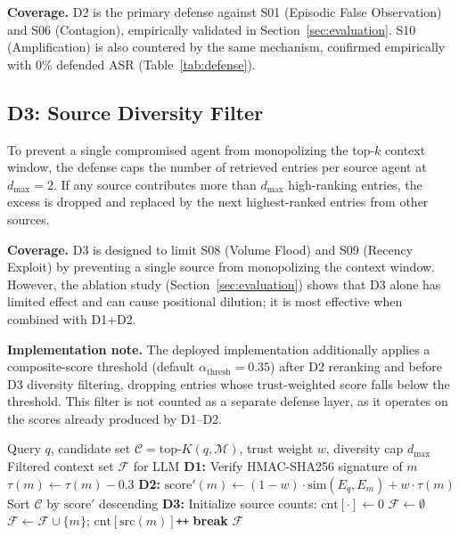 \documentclass[conference]{IEEEtran}
\begin{document}
\textbf{Coverage.} D2 is the primary defense against S01 (Episodic False Observation) and S06 (Contagion), empirically validated in Section~\ref{sec:evaluation}. S10 (Amplification) is also countered by the same mechanism, confirmed empirically with 0\% defended ASR (Table~\ref{tab:defense}).

\subsection{D3: Source Diversity Filter}
To prevent a single compromised agent from monopolizing the top-$k$ context window, the defense caps the number of retrieved entries per source agent at $d_{\max} = 2$. If any source contributes more than $d_{\max}$ high-ranking entries, the excess is dropped and replaced by the next highest-ranked entries from other sources.

\textbf{Coverage.} D3 is designed to limit S08 (Volume Flood) and S09 (Recency Exploit) by preventing a single source from monopolizing the context window. However, the ablation study (Section~\ref{sec:evaluation}) shows that D3 alone has limited effect and can cause positional dilution; it is most effective when combined with D1+D2.

\textbf{Implementation note.} The deployed implementation additionally applies a composite-score threshold (default $\alpha_{\text{thresh}} = 0.35$) after D2 reranking and before D3 diversity filtering, dropping entries whose trust-weighted score falls below the threshold. This filter is not counted as a separate defense layer, as it operates on the scores already produced by D1--D2.

\begin{algorithm}[t]
\caption{Three-Layer Defense Pipeline}
\label{alg:defense}
\begin{algorithmic}[1]
\REQUIRE Query $q$, candidate set $\mathcal{C} = \text{top-}K(q, \mathcal{M})$, trust weight $w$, diversity cap $d_{\max}$
\ENSURE Filtered context set $\mathcal{F}$ for LLM
    \STATE \textbf{D1:} Verify HMAC-SHA256 signature of $m$
        \STATE $\tau(m) \leftarrow \tau(m) - 0.3$ 
    \ENDIF
    \STATE \textbf{D2:} $\text{score}'(m) \leftarrow (1-w) \cdot \text{sim}(E_q, E_m) + w \cdot \tau(m)$
\ENDFOR
\STATE Sort $\mathcal{C}$ by $\text{score}'$ descending
\STATE \textbf{D3:} Initialize source counts: $\text{cnt}[\cdot] \leftarrow 0$
\STATE $\mathcal{F} \leftarrow \emptyset$
        \STATE $\mathcal{F} \leftarrow \mathcal{F} \cup \{m\}$; $\text{cnt}[\text{src}(m)]$\texttt{++}
    \ENDIF
     \STATE \textbf{break} \ENDIF
\ENDFOR
\RETURN $\mathcal{F}$
\end{algorithmic}
\end{algorithm}
\end{document}
